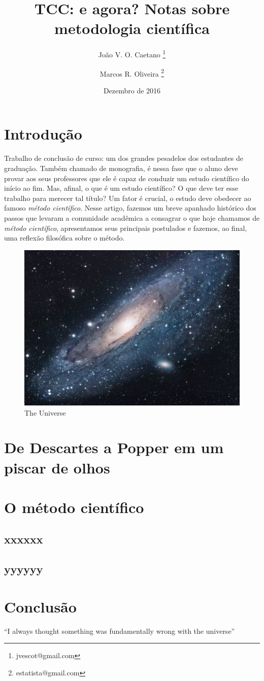 \documentclass{article}
\title{TCC: e agora? Notas sobre metodologia científica}
\author{João V. O. Caetano \thanks{jvescot@gmail.com}  \and Marcos R. Oliveira \thanks{estatista@gmail.com}}
\date{Dezembro de 2016}
\begin{document}
\maketitle

\section{Introdução}
Trabalho de conclusão de curso: um dos grandes pesadelos dos estudantes de graduação. Também chamado de monografia, é nessa fase que o aluno deve provar aos seus professores que ele é capaz de conduzir um estudo científico do início ao fim. Mas, afinal, o que é um estudo científico? O que deve ter esse trabalho para merecer tal título? Um fator é crucial, o estudo deve obedecer ao famoso \textit{método científico}. Nesse artigo, fazemos um breve apanhado histórico dos passos que levaram a comunidade acadêmica a consagrar o que hoje chamamos de \textit{método científico}, apresentamos seus principais postulados e fazemos, ao final, uma reflexão filosófica sobre o método.


\begin{figure}[h!]
\centering
\includegraphics[scale=1.7]{universe.jpg}
\caption{The Universe}
\label{fig:univerise}
\end{figure}


\section{De Descartes a Popper em um piscar de olhos}


\section{O método científico}

\subsection{xxxxxx}

\subsection{yyyyyy}

\section{Conclusão}
``I always thought something was fundamentally wrong with the universe'' \citep{adams1995hitchhiker}



\end{document}
